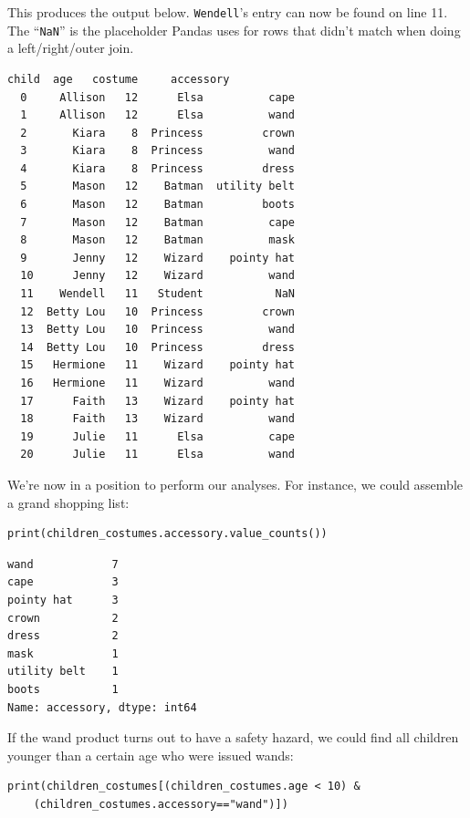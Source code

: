 
This produces the output below. \texttt{Wendell}'s entry can now be found on
line 11. The ``\texttt{NaN}'' is the placeholder Pandas uses for rows that
didn't match when doing a left/right/outer join.

\begin{Verbatim}[fontsize=\small,samepage=true,frame=leftline,framesep=5mm,framerule=1mm]
          child  age   costume     accessory
  0     Allison   12      Elsa          cape
  1     Allison   12      Elsa          wand
  2       Kiara    8  Princess         crown
  3       Kiara    8  Princess          wand
  4       Kiara    8  Princess         dress
  5       Mason   12    Batman  utility belt
  6       Mason   12    Batman         boots
  7       Mason   12    Batman          cape
  8       Mason   12    Batman          mask
  9       Jenny   12    Wizard    pointy hat
  10      Jenny   12    Wizard          wand
  11    Wendell   11   Student           NaN
  12  Betty Lou   10  Princess         crown
  13  Betty Lou   10  Princess          wand
  14  Betty Lou   10  Princess         dress
  15   Hermione   11    Wizard    pointy hat
  16   Hermione   11    Wizard          wand
  17      Faith   13    Wizard    pointy hat
  18      Faith   13    Wizard          wand
  19      Julie   11      Elsa          cape
  20      Julie   11      Elsa          wand
\end{Verbatim}

We're now in a position to perform our analyses. For instance, we could
assemble a grand shopping list:

\begin{Verbatim}[fontsize=\footnotesize,samepage=true,frame=single,framesep=3mm]
print(children_costumes.accessory.value_counts())
\end{Verbatim}
\vspace{-.2in}

\begin{Verbatim}[fontsize=\footnotesize,samepage=true,frame=leftline,framesep=5mm,framerule=1mm]
wand            7
cape            3
pointy hat      3
crown           2
dress           2
mask            1
utility belt    1
boots           1
Name: accessory, dtype: int64
\end{Verbatim}

If the wand product turns out to have a safety hazard, we could find all
children younger than a certain age who were issued wands:

\begin{Verbatim}[fontsize=\small,samepage=true,frame=single,framesep=3mm]
print(children_costumes[(children_costumes.age < 10) & 
    (children_costumes.accessory=="wand")])
\end{Verbatim}
\vspace{-.2in}

